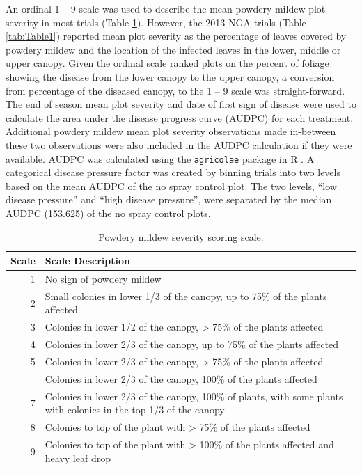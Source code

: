 \documentclass[agronomy,article,submit,moreauthors,pdftex]{mdpi}
\begin{document}
An ordinal 1 -- 9 scale was used to describe the mean powdery mildew plot severity in most trials (Table \ref{tab:Table2}).
However, the 2013 NGA trials (Table \ref{tab:Table1}) reported mean plot severity as the percentage of leaves covered by powdery mildew and the location of the infected leaves in the lower, middle or upper canopy.
Given the ordinal scale ranked plots on the percent of foliage showing the disease from the lower canopy to the upper canopy, a conversion from percentage of the diseased canopy, to the 1 -- 9 scale was straight-forward.
The end of season mean plot severity and date of first sign of disease were used to calculate the area under the disease progress curve (AUDPC) for each treatment.
Additional powdery mildew mean plot severity observations made in-between these two observations were also included in the AUDPC calculation if they were available.
AUDPC was calculated using the \texttt{agricolae} package in R \citep{agricolae2020}.
A categorical disease pressure factor was created by binning trials into two levels based on the mean AUDPC of the no spray control plot.
The two levels, ``low disease pressure'' and ``high disease pressure'', were separated by the median AUDPC (153.625) of the no spray control plots.

\begin{table}

\caption{\label{tab:Table2}Powdery mildew severity scoring scale.}
\centering
\begin{tabular}[t]{rl}
\toprule
Scale & Scale Description\\
\midrule
1 & No sign of powdery mildew\\
2 & Small colonies in lower 1/3 of the canopy, up to 75\% of the plants affected\\
3 & Colonies in lower 1/2 of the canopy, > 75\% of the plants affected\\
4 & Colonies in lower 2/3 of the canopy, up to 75\% of the plants affected\\
5 & Colonies in lower 2/3 of the canopy, > 75\% of the plants affected\\
\addlinespace
6 & Colonies in lower 2/3 of the canopy, 100\% of the plants affected\\
7 & Colonies in lower 2/3 of the canopy, 100\% of plants, with some plants with colonies in the top 1/3 of the canopy\\
8 & Colonies to top of the plant with > 75\% of the plants affected\\
9 & Colonies to top of the plant with > 100\% of the plants affected and heavy leaf drop\\
\bottomrule
\end{tabular}
\end{table}
\end{document}
